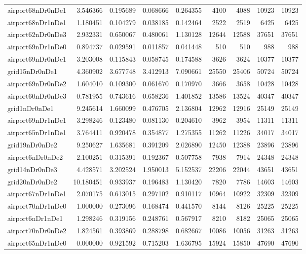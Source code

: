 \begin{longtable}{|l|r|r|r|r|r|r|r|r|}
airport68nDr0nDe1 & 3.546366 & 0.195689 & 0.068666 & 0.264355 & 4100 & 4088 & 10923 & 10923 \\
airport68nDr1nDe1 & 1.180451 & 0.104279 & 0.038185 & 0.142464 & 2522 & 2519 & 6425 & 6425 \\
airport62nDr0nDe3 & 2.932331 & 0.650067 & 0.480061 & 1.130128 & 12644 & 12588 & 37651 & 37651 \\
airport69nDr1nDe0 & 0.894737 & 0.029591 & 0.011857 & 0.041448 & 510 & 510 & 988 & 988 \\
airport69nDr0nDe1 & 3.203008 & 0.115843 & 0.058745 & 0.174588 & 3626 & 3624 & 10377 & 10377 \\
grid15nDr0nDe1 & 4.360902 & 3.677748 & 3.412913 & 7.090661 & 25550 & 25406 & 50724 & 50724 \\
airport69nDr0nDe2 & 1.604010 & 0.109300 & 0.061670 & 0.170970 & 3666 & 3658 & 10428 & 10428 \\
airport60nDr0nDe3 & 0.781955 & 0.743616 & 0.658236 & 1.401852 & 13586 & 13524 & 40347 & 40347 \\
grid1nDr0nDe1 & 9.245614 & 1.660099 & 0.476705 & 2.136804 & 12962 & 12916 & 25149 & 25149 \\
airport69nDr1nDe1 & 3.298246 & 0.123480 & 0.081130 & 0.204610 & 3962 & 3954 & 11311 & 11311 \\
airport65nDr1nDe1 & 3.764411 & 0.920478 & 0.354877 & 1.275355 & 11262 & 11226 & 34017 & 34017 \\
grid19nDr0nDe2 & 9.250627 & 1.635681 & 0.391209 & 2.026890 & 12450 & 12388 & 23896 & 23896 \\
airport6nDr0nDe2 & 2.100251 & 0.315391 & 0.192367 & 0.507758 & 7938 & 7914 & 24348 & 24348 \\
grid14nDr0nDe3 & 4.428571 & 3.202524 & 1.950013 & 5.152537 & 22206 & 22044 & 43651 & 43651 \\
grid20nDr0nDe2 & 10.180451 & 0.933937 & 0.196483 & 1.130420 & 7820 & 7786 & 14603 & 14603 \\
airport67nDr1nDe1 & 2.070175 & 0.613015 & 0.297102 & 0.910117 & 10964 & 10922 & 32309 & 32309 \\
airport70nDr1nDe0 & 1.000000 & 0.273096 & 0.168474 & 0.441570 & 8144 & 8126 & 25225 & 25225 \\
airport6nDr1nDe1 & 1.298246 & 0.319156 & 0.248761 & 0.567917 & 8210 & 8182 & 25065 & 25065 \\
airport70nDr0nDe2 & 1.824561 & 0.393869 & 0.288798 & 0.682667 & 10086 & 10056 & 31263 & 31263 \\
airport65nDr1nDe0 & 0.000000 & 0.921592 & 0.715203 & 1.636795 & 15924 & 15850 & 47690 & 47690 \\

\end{longtable}
